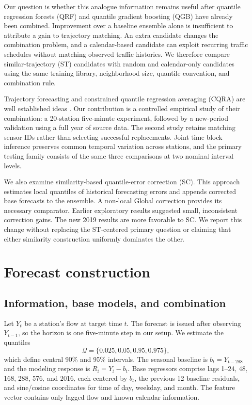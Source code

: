 \documentclass[11pt]{article}
\newcommand{\Q}{\mathcal Q}
\begin{document}
Our question is whether this analogue information remains useful after quantile regression forests (QRF) and quantile gradient boosting (QGB) have already been combined. Improvement over a baseline ensemble alone is insufficient to attribute a gain to trajectory matching. An extra candidate changes the combination problem, and a calendar-based candidate can exploit recurring traffic schedules without matching observed traffic histories. We therefore compare similar-trajectory (ST) candidates with random and calendar-only candidates using the same training library, neighborhood size, quantile convention, and combination rule.

Trajectory forecasting and constrained quantile regression averaging (CQRA) are well established ideas \cite{wang}. Our contribution is a controlled empirical study of their combination: a 20-station five-minute experiment, followed by a new-period validation using a full year of source data. The second study retains matching sensor IDs rather than selecting successful replacements. Joint time-block inference preserves common temporal variation across stations, and the primary testing family consists of the same three comparisons at two nominal interval levels.

We also examine similarity-based quantile-error correction (SC). This approach estimates local quantiles of historical forecasting errors and appends corrected base forecasts to the ensemble. A non-local Global correction provides its necessary comparator. Earlier exploratory results suggested small, inconsistent correction gains. The new 2019 results are more favorable to SC. We report this change without replacing the ST-centered primary question or claiming that either similarity construction uniformly dominates the other.

\section{Forecast construction}
\subsection{Information, base models, and combination}
Let $Y_t$ be a station's flow at target time $t$. The forecast is issued after observing $Y_{t-1}$, so the horizon is one five-minute step in our setup. We estimate the quantiles
\[
\Q=\{0.025,0.05,0.95,0.975\},
\]
which define central 90\% and 95\% intervals. The seasonal baseline is $b_t=Y_{t-288}$ and the modeling response is $R_t=Y_t-b_t$. Base regressors comprise lags 1--24, 48, 168, 288, 576, and 2016, each centered by $b_t$, the previous 12 baseline residuals, and sine/cosine coordinates for time of day, weekday, and month. The feature vector contains only lagged flow and known calendar information.
\end{document}
